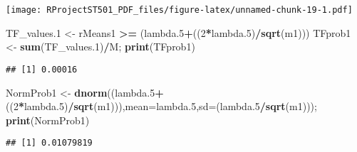 \documentclass[
]{article}
\newenvironment{Shaded}{\begin{snugshade}}{\end{snugshade}}
\newcommand{\DataTypeTok}[1]{\textcolor[rgb]{0.13,0.29,0.53}{#1}}
\newcommand{\DecValTok}[1]{\textcolor[rgb]{0.00,0.00,0.81}{#1}}
\newcommand{\FloatTok}[1]{\textcolor[rgb]{0.00,0.00,0.81}{#1}}
\newcommand{\KeywordTok}[1]{\textcolor[rgb]{0.13,0.29,0.53}{\textbf{#1}}}
\newcommand{\NormalTok}[1]{#1}
\newcommand{\OperatorTok}[1]{\textcolor[rgb]{0.81,0.36,0.00}{\textbf{#1}}}
\newcommand{\OtherTok}[1]{\textcolor[rgb]{0.56,0.35,0.01}{#1}}
\newcommand{\StringTok}[1]{\textcolor[rgb]{0.31,0.60,0.02}{#1}}
\begin{document}
\begin{Shaded}
\end{Shaded}

\texttt{[image: RProjectST501\_PDF\_files/figure-latex/unnamed-chunk-19-1.pdf]}

\begin{Shaded}
\begin{Highlighting}[]
\NormalTok{TF_values}\FloatTok{.1}\NormalTok{ <-}\StringTok{ }\NormalTok{rMeans1 }\OperatorTok{>=}\StringTok{ }\NormalTok{(lambda}\FloatTok{.5}\OperatorTok{+}\NormalTok{((}\DecValTok{2}\OperatorTok{*}\NormalTok{lambda}\FloatTok{.5}\NormalTok{)}\OperatorTok{/}\KeywordTok{sqrt}\NormalTok{(m1)))}
\NormalTok{TFprob1 <-}\StringTok{ }\KeywordTok{sum}\NormalTok{(TF_values}\FloatTok{.1}\NormalTok{)}\OperatorTok{/}\NormalTok{M; }\KeywordTok{print}\NormalTok{(TFprob1)}
\end{Highlighting}
\end{Shaded}

\begin{verbatim}
## [1] 0.00016
\end{verbatim}

\begin{Shaded}
\begin{Highlighting}[]
\NormalTok{NormProb1 <-}\StringTok{ }\KeywordTok{dnorm}\NormalTok{((lambda}\FloatTok{.5}\OperatorTok{+}\NormalTok{((}\DecValTok{2}\OperatorTok{*}\NormalTok{lambda}\FloatTok{.5}\NormalTok{)}\OperatorTok{/}\KeywordTok{sqrt}\NormalTok{(m1))),}\DataTypeTok{mean=}\NormalTok{lambda}\FloatTok{.5}\NormalTok{,}\DataTypeTok{sd=}\NormalTok{(lambda}\FloatTok{.5}\OperatorTok{/}\KeywordTok{sqrt}\NormalTok{(m1))); }\KeywordTok{print}\NormalTok{(NormProb1)}
\end{Highlighting}
\end{Shaded}

\begin{verbatim}
## [1] 0.01079819
\end{verbatim}
\end{document}

